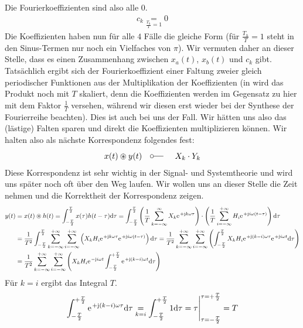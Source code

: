 \documentclass[11pt,a4paper,DIV=12]{scrartcl}
\begin{document}
Die Fourierkoeffizienten sind also alle $0$.
%
%
\begin{align}
	c_k\underset{\frac{T_h}{T}=1}{=}0
\end{align}
%
%
Die Koeffizienten haben nun für alle $4$ Fälle die gleiche Form (für
$\frac{T_h}{T}=1$ steht in den Sinus-Termen nur noch ein Vielfaches von $\pi$).
%
Wir vermuten daher an dieser Stelle, dass es einen Zusammenhang zwischen
$x_{a}(t)$, $x_{b}(t)$ und $c_k$ gibt.
%
Tatsächlich ergibt sich der Fourierkoeffizient einer Faltung zweier gleich
periodischer Funktionen aus der Multiplikation der Koeffizienten (in \cite[Kap. 3, S. 208]{Oppenheim1997} wird das Produkt noch mit $T$ skaliert, denn die Koeffizienten werden im Gegensatz zu hier mit dem Faktor $\frac{1}{T}$ versehen, während wir diesen erst wieder bei der Synthese der Fourierreihe beachten).
%
Dies ist auch bei uns der Fall.
%
Wir hätten uns also das (lästige) Falten sparen und direkt die Koeffizienten
multiplizieren können. Wir halten also als nächste Korrespondenz folgendes fest:
%
\begin{align}
	x(t)\circledast y(t)\quad\fourier\quad X_k\cdot Y_k
\end{align}
%
Diese Korrespondenz ist sehr wichtig in der Signal- und Systemtheorie und wird
uns später noch oft über den Weg laufen.
%
Wir wollen uns an dieser Stelle die Zeit nehmen und die Korrektheit der
Korrespondenz zeigen.
%
%
\begin{align}
	y(t)&=x(t)\circledast h(t)
	=\int_{-\frac{T}{2}}^{\frac{T}{2}}x(\tau)h(t-\tau)\diff \tau
	=\int_{-\frac{T}{2}}^{\frac{T}{2}}\left (\frac{1}{T}\sum_{k=-\infty}^{\infty}X_k\e^{+\im k \omega \tau}\right )\cdot \left (\frac{1}{T}\sum_{i=-\infty}^{+\infty}H_i\e^{+\im i \omega (t-\tau)}\right )\diff \tau\nonumber \\
	&=\frac{1}{T^2}\int_{-\frac{T}{2}}^{\frac{T}{2}}\sum_{k=-\infty}^{+\infty}\sum_{i=-\infty}^{+\infty}\left (X_kH_i\e^{+\im k \omega \tau}\e^{+\im i \omega (t-\tau)}\right )\diff \tau
	=\frac{1}{T^2}\sum_{k=-\infty}^{+\infty}\sum_{i=-\infty}^{+\infty}\left (\int_{-\frac{T}{2}}^{\frac{T}{2}}X_kH_i\e^{+\im (k-i) \omega \tau}\e^{+\im i \omega t}\diff \tau\right )\nonumber \\
	&=\frac{1}{T^2}\sum_{k=-\infty}^{+\infty}\sum_{i=-\infty}^{+\infty}\left (X_kH_i\e^{-\im i \omega t}\int_{-\frac{T}{2}}^{+\frac{T}{2}}\e^{+\im (k-i)\omega t}\diff \tau \right )
\end{align}
%
%
Für $k=i$ ergibt das Integral $T$.
%
%
\begin{align}
	\int_{-\frac{T}{2}}^{+\frac{T}{2}}\e^{+\im (k-i)\omega \tau}\diff \tau \underset{k=i}{=}\int_{-\frac{T}{2}}^{+\frac{T}{2}}1\diff \tau =\tau \Bigg |_{\tau=-\frac{T}{2}}^{\tau=+\frac{T}{2}}=T
\end{align}
\end{document}
